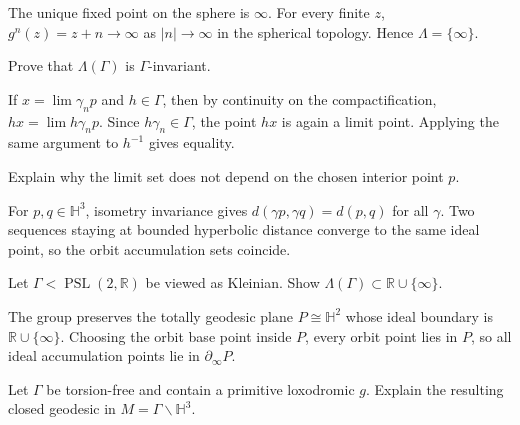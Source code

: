 \begin{solution}
The unique fixed point on the sphere is \(\infty\).  For every finite \(z\), \(g^n(z)=z+n\to\infty\) as \(|n|\to\infty\) in the spherical topology.  Hence \(\Lambda=\{\infty\}\).
\end{solution}

\begin{problem}\label{prob:vii37-03}
Prove that \(\Lambda(\Gamma)\) is \(\Gamma\)-invariant.
\end{problem}

\begin{solution}
If \(x=\lim \gamma_n p\) and \(h\in\Gamma\), then by continuity on the compactification, \(hx=\lim h\gamma_n p\).  Since \(h\gamma_n\in\Gamma\), the point \(hx\) is again a limit point.  Applying the same argument to \(h^{-1}\) gives equality.
\end{solution}

\begin{problem}\label{prob:vii37-04}
Explain why the limit set does not depend on the chosen interior point \(p\).
\end{problem}

\begin{solution}
For \(p,q\in\mathbb H^3\), isometry invariance gives \(d(\gamma p,\gamma q)=d(p,q)\) for all \(\gamma\).  Two sequences staying at bounded hyperbolic distance converge to the same ideal point, so the orbit accumulation sets coincide.
\end{solution}

\begin{problem}\label{prob:vii37-05}
Let \(\Gamma<\operatorname{PSL}(2,\mathbb R)\) be viewed as Kleinian.  Show \(\Lambda(\Gamma)\subset\mathbb R\cup\{\infty\}\).
\end{problem}

\begin{solution}
The group preserves the totally geodesic plane \(P\cong\mathbb H^2\) whose ideal boundary is \(\mathbb R\cup\{\infty\}\).  Choosing the orbit base point inside \(P\), every orbit point lies in \(P\), so all ideal accumulation points lie in \(\partial_\infty P\).
\end{solution}

\begin{problem}\label{prob:vii37-06}
Let \(\Gamma\) be torsion-free and contain a primitive loxodromic \(g\).  Explain the resulting closed geodesic in \(M=\Gamma\backslash\mathbb H^3\).
\end{problem}

